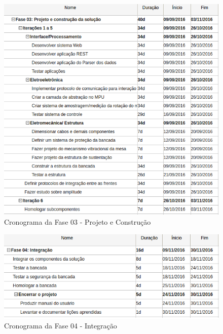 \begin{figure}[!ht]
\centering
\includegraphics[scale=0.9]{figuras/cronograma_fase03.png}
\caption{Cronograma da Fase 03 - Projeto e Construção}
\end{figure}

\begin{figure}[!ht]
\centering
\includegraphics[scale=0.9]{figuras/cronograma_fase04.png}
\caption{Cronograma da Fase 04 - Integração}
\end{figure}
\vfill
\pagebreak

